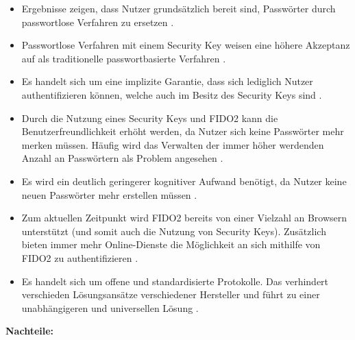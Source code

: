\begin{itemize}
    \item Ergebnisse zeigen, dass Nutzer grundsätzlich bereit sind, Passwörter durch passwortlose Verfahren zu ersetzen \cite{lyastani2020fido2}.
    \item Passwortlose Verfahren mit einem Security Key weisen eine höhere Akzeptanz auf als traditionelle passwortbasierte Verfahren \cite{lyastani2020fido2}.
    \item Es handelt sich um eine implizite Garantie, dass sich lediglich Nutzer authentifizieren können, welche auch im Besitz des Security Keys sind \cite{lyastani2020fido2}.
    \item Durch die Nutzung eines Security Keys und \ac{FIDO}2 kann die Benutzerfreundlichkeit erhöht werden, da Nutzer sich keine Passwörter mehr merken müssen. Häufig wird das Verwalten der immer höher werdenden Anzahl an Passwörtern als Problem angesehen \cite{lyastani2020fido2} \cite{farke2020you}.
    \item Es wird ein deutlich geringerer kognitiver Aufwand benötigt, da Nutzer keine neuen Passwörter mehr erstellen müssen \cite{lyastani2020fido2}.
    \item Zum aktuellen Zeitpunkt wird \ac{FIDO}2 bereits von einer Vielzahl an Browsern unterstützt (und somit auch die Nutzung von Security Keys). Zusätzlich bieten immer mehr Online-Dienste die Möglichkeit an sich mithilfe von \ac{FIDO}2 zu authentifizieren \cite{lyastani2020fido2} \cite{farke2020you}.
    \item Es handelt sich um offene und standardisierte Protokolle. Das verhindert verschieden Lösungsansätze verschiedener Hersteller und führt zu einer unabhängigeren und universellen Lösung \cite{farke2020you}.
\end{itemize}

\textbf{Nachteile:}

